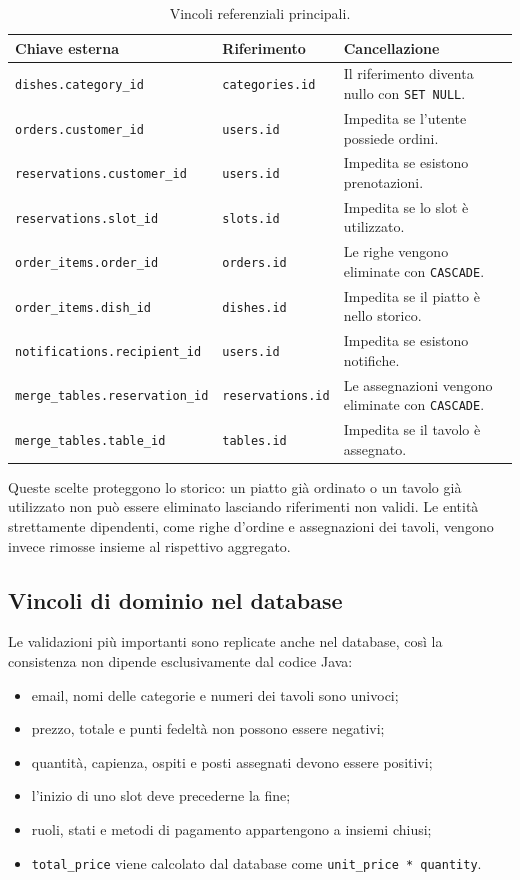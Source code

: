 \documentclass[12pt,a4paper]{article}
\newcommand{\code}[1]{\nolinkurl{#1}}
\begin{document}
\begin{table}[H]
\centering
{}
\begin{tabular}{p{3.8cm}p{3.8cm}p{5.8cm}}
\toprule
\textbf{Chiave esterna} & \textbf{Riferimento} & \textbf{Cancellazione} \\
\midrule
\code{dishes.category\_id} & \code{categories.id} & Il riferimento diventa nullo con \code{SET NULL}. \\
\code{orders.customer\_id} & \code{users.id} & Impedita se l'utente possiede ordini. \\
\code{reservations.customer\_id} & \code{users.id} & Impedita se esistono prenotazioni. \\
\code{reservations.slot\_id} & \code{slots.id} & Impedita se lo slot è utilizzato. \\
\code{order\_items.order\_id} & \code{orders.id} & Le righe vengono eliminate con \code{CASCADE}. \\
\code{order\_items.dish\_id} & \code{dishes.id} & Impedita se il piatto è nello storico. \\
\code{notifications.recipient\_id} & \code{users.id} & Impedita se esistono notifiche. \\
\code{merge\_tables.reservation\_id} & \code{reservations.id} & Le assegnazioni vengono eliminate con \code{CASCADE}. \\
\code{merge\_tables.table\_id} & \code{tables.id} & Impedita se il tavolo è assegnato. \\
\bottomrule
\end{tabular}
\caption{Vincoli referenziali principali.}
\end{table}

Queste scelte proteggono lo storico: un piatto già ordinato o un tavolo già
utilizzato non può essere eliminato lasciando riferimenti non validi. Le entità
strettamente dipendenti, come righe d'ordine e assegnazioni dei tavoli, vengono
invece rimosse insieme al rispettivo aggregato.

\subsection{Vincoli di dominio nel database}

Le validazioni più importanti sono replicate anche nel database, così la
consistenza non dipende esclusivamente dal codice Java:

\begin{itemize}[leftmargin=*]
  \item email, nomi delle categorie e numeri dei tavoli sono univoci;
  \item prezzo, totale e punti fedeltà non possono essere negativi;
  \item quantità, capienza, ospiti e posti assegnati devono essere positivi;
  \item l'inizio di uno slot deve precederne la fine;
  \item ruoli, stati e metodi di pagamento appartengono a insiemi chiusi;
  \item \code{total\_price} viene calcolato dal database come
        \code{unit\_price * quantity}.
\end{itemize}
\end{document}
